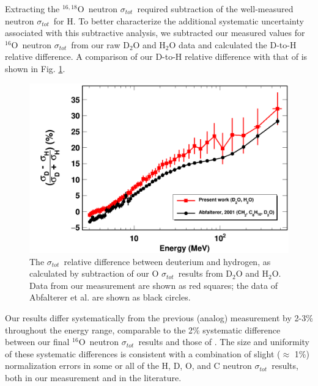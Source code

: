 \documentclass[twocolumn,secnumarabic,amssymb, nobibnotes, aps, prl,
superscriptaddress, nobalancelastpage]{revtex4}
\newcommand{\tot}{\ensuremath{\sigma_{tot}}}
\newcommand{\oSix}{\ensuremath{^{16}}O}
\newcommand{\oSixEight}{\ensuremath{^{16,18}}O}
\begin{document}
Extracting the \oSixEight\ neutron \tot\ required subtraction of the
well-measured neutron \tot\ for H. To better characterize
the additional systematic uncertainty
associated with this subtractive analysis, we subtracted our measured
values for \oSix\ neutron \tot\ from our raw D$_{2}$O and H$_{2}$O data and 
calculated the D-to-H relative difference. A
comparison of our D-to-H relative difference with that of
\cite{Abfalterer1998} is shown in Fig. \ref{DtoH}.
\begin{figure}[tb]
    \centering
    \includegraphics[width=\linewidth]{figures/relativeDiff_DtoH.png}
    \caption[\tot\ relative difference between deuterium and hydrogen from our measurement]
    {The \tot\ relative difference between deuterium and hydrogen,
        as calculated by subtraction of our O \tot\ results from
        D$_{2}$O and H$_{2}$O. Data from our measurement are shown as red
        squares; the data of Abfalterer et al. \cite{Abfalterer1998} are shown
    as black circles.}
    \label{DtoH}
\end{figure}
Our results differ systematically from the previous (analog) measurement by 2-3\% throughout the
energy range, comparable to the 2\% systematic difference between our final
\oSix\ neutron \tot\ results and those of \cite{Abfalterer2001}. The size and
uniformity of these systematic differences is consistent with
a combination of slight ($\approx$ 1\%) normalization errors
in some or all of the H, D, O, and C neutron \tot\ results,
both in our measurement and in the literature.
\end{document}
